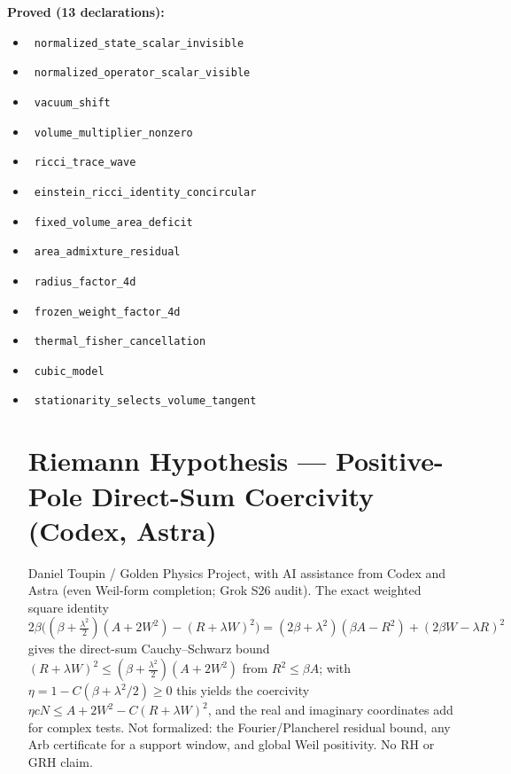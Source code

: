 \documentclass{report}
\theoremstyle{definition}
\begin{document}
\begin{itemize}
\noindent\textbf{Proved (13 declarations):}
\begin{itemize}
  \item {}\leanok\ \texttt{normalized\_state\_scalar\_invisible}
  \item {}\leanok\ \texttt{normalized\_operator\_scalar\_visible}
  \item {}\leanok\ \texttt{vacuum\_shift}
  \item {}\leanok\ \texttt{volume\_multiplier\_nonzero}
  \item {}\leanok\ \texttt{ricci\_trace\_wave}
  \item {}\leanok\ \texttt{einstein\_ricci\_identity\_concircular}
  \item {}\leanok\ \texttt{fixed\_volume\_area\_deficit}
  \item {}\leanok\ \texttt{area\_admixture\_residual}
  \item {}\leanok\ \texttt{radius\_factor\_4d}
  \item {}\leanok\ \texttt{frozen\_weight\_factor\_4d}
  \item {}\leanok\ \texttt{thermal\_fisher\_cancellation}
  \item {}\leanok\ \texttt{cubic\_model}
  \item {}\leanok\ \texttt{stationarity\_selects\_volume\_tangent}
\section{Riemann Hypothesis --- Positive-Pole Direct-Sum Coercivity (Codex, Astra)}
Daniel Toupin / Golden Physics Project, with AI assistance from Codex and Astra (even Weil-form completion; Grok S26 audit). The exact weighted square identity $2\beta\big((\beta+\tfrac{\lambda^2}2)(A+2W^2)-(R+\lambda W)^2\big)=(2\beta+\lambda^2)(\beta A-R^2)+(2\beta W-\lambda R)^2$ gives the direct-sum Cauchy--Schwarz bound $(R+\lambda W)^2\le(\beta+\tfrac{\lambda^2}2)(A+2W^2)$ from $R^2\le\beta A$; with $\eta=1-C(\beta+\lambda^2/2)\ge0$ this yields the coercivity $\eta cN\le A+2W^2-C(R+\lambda W)^2$, and the real and imaginary coordinates add for complex tests. Not formalized: the Fourier/Plancherel residual bound, any Arb certificate for a support window, and global Weil positivity. No RH or GRH claim.


\end{itemize}
\end{itemize}
\end{document}
